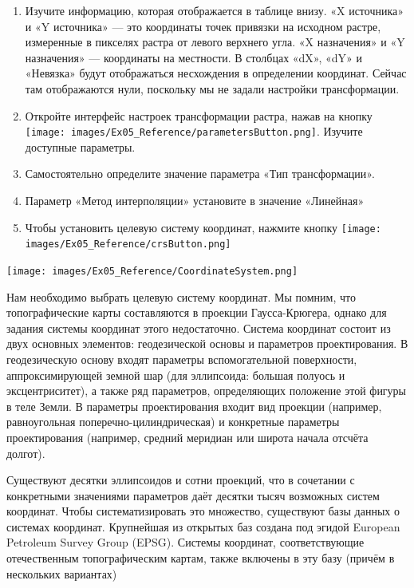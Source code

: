 \documentclass[
  12pt,
]{book}
\begin{document}
\begin{enumerate}
\def\labelenumi{\arabic{enumi}.}
\setcounter{enumi}{9}
\item
  Изучите информацию, которая отображается в таблице внизу. «X источника» и «Y источника» --- это координаты точек привязки на исходном растре, измеренные в пикселях растра от левого верхнего угла. «X назначения» и «Y назначения» --- координаты на местности. В столбцах «dX», «dY» и «Невязка» будут отображаться несхождения в определении координат. Сейчас там отображаются нули, поскольку мы не задали настройки трансформации.
\item
  Откройте интерфейс настроек трансформации растра, нажав на кнопку \texttt{[image: images/Ex05\_Reference/parametersButton.png]}. Изучите доступные параметры.
\item
  Самостоятельно определите значение параметра «Тип трансформации».
\item
  Параметр «Метод интерполяции» установите в значение «Линейная»
\item
  Чтобы установить целевую систему координат, нажмите кнопку \texttt{[image: images/Ex05\_Reference/crsButton.png]}
\end{enumerate}

\texttt{[image: images/Ex05\_Reference/CoordinateSystem.png]}

Нам необходимо выбрать целевую систему координат. Мы помним, что топографические карты составляются в проекции Гаусса-Крюгера, однако для задания системы координат этого недостаточно. Система координат состоит из двух основных элементов: геодезической основы и параметров проектирования. В геодезическую основу входят параметры вспомогательной поверхности, аппроксимирующей земной шар (для эллипсоида: большая полуось и эксцентриситет), а также ряд параметров, определяющих положение этой фигуры в теле Земли. В параметры проектирования входит вид проекции (например, равноугольная поперечно-цилиндрическая) и конкретные параметры проектирования (например, средний меридиан или широта начала отсчёта долгот).

Существуют десятки эллипсоидов и сотни проекций, что в сочетании с конкретными значениями параметров даёт десятки тысяч возможных систем координат. Чтобы систематизировать это множество, существуют базы данных о системах координат. Крупнейшая из открытых баз создана под эгидой European Petroleum Survey Group (EPSG). Системы координат, соответствующие отечественным топографическим картам, также включены в эту базу (причём в нескольких вариантах)
\end{document}
